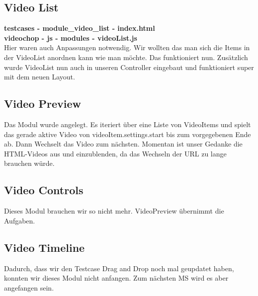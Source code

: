 \documentclass[a4paper,10pt]{scrartcl}
\begin{document}
\subsection{Video List}
\textbf{testcases - module\_video\_list - index.html} \\
\textbf{videochop - js - modules - videoList.js} \\
Hier waren auch Anpassungen notwendig. Wir wollten das man sich die Items in der VideoList anordnen kann wie man möchte. Das funktioniert nun. Zusätzlich wurde VideoList nun auch in unseren Controller eingebaut und funktioniert super mit dem neuen Layout.\\
\subsection{Video Preview}
Das Modul wurde angelegt. Es iteriert über eine Liste von VideoItems und spielt das gerade aktive Video von videoItem.settings.start bis zum vorgegebenen Ende ab. Dann Wechselt das Video zum nächsten. Momentan ist unser Gedanke die HTML-Videos aus und einzublenden, da das Wechseln der URL zu lange brauchen würde.
\subsection{Video Controls}
Dieses Modul brauchen wir so nicht mehr. VideoPreview übernimmt die Aufgaben.
\subsection{Video Timeline}
Dadurch, dass wir den Testcase Drag and Drop noch mal geupdatet haben, konnten wir dieses Modul nicht anfangen. Zum nächsten MS wird es aber angefangen sein.
\end{document}

